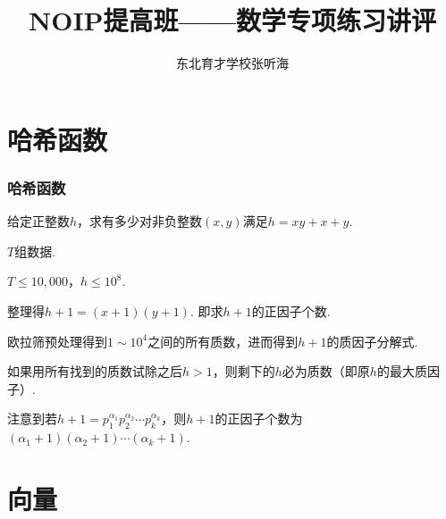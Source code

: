 \documentclass{beamer}
\title{\xw NOIP提高班——数学专项练习讲评}
\author{\li 东北育才学校\quad \xk 张听海}
\def\leq{\leqslant}
\def\bkh{\!\!（}
\def\ekh{）\!\!}
\def\dou{，\!\!}
\begin{document}
    \renewcommand{\baselinestretch}{1.25}\normalsize
    \setlength{\parindent}{0em}
    \setlength{\abovedisplayskip}{1pt}
    \setlength{\belowdisplayskip}{1pt}

    \maketitle

    \begin{frame}
        \tableofcontents[hideothersubsections]
    \end{frame}

    \section{哈希函数}

    \begin{frame}[shrink]
        \frametitle{哈希函数}
        \begin{block}

            给定正整数$h$\dou 求有多少对非负整数$(x,y)$满足$h=xy+x+y$.\pause
            
            $T$组数据.\pause

            $T\leq 10,000$\dou $h\leq {10}^8$.\pause
        \end{block}

        整理得$h+1=(x+1)(y+1)$. 即求$h+1$的正因子个数.\pause

        欧拉筛预处理得到$1\sim {10}^4$之间的所有质数\dou 进而得到$h+1$的质因子分解式.\pause

        如果用所有找到的质数试除之后$h>1$\dou 则剩下的$h$必为质数\bkh 即原$h$的最大质因子\ekh .\pause

        注意到若$h+1=p_1^{\alpha_1}p_2^{\alpha_2}\cdots p_k^{\alpha_k}$\dou 则$h+1$的正因子个数为$(\alpha_1+1)(\alpha_2+1)\cdots(\alpha_k+1)$.
    \end{frame}

    \section{向量}
\end{document}
